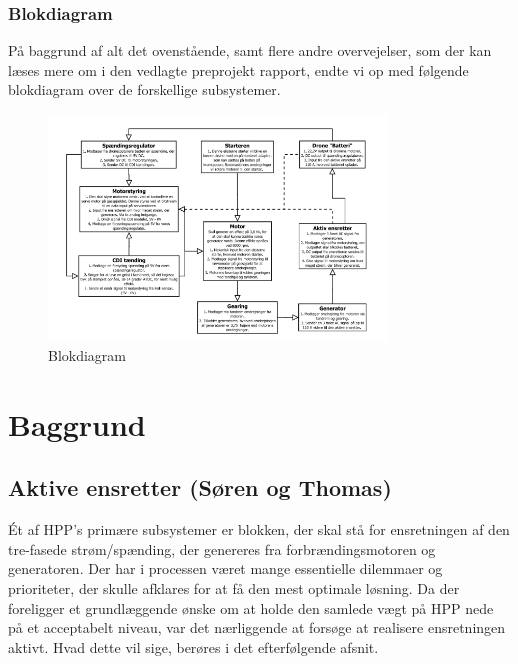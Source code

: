 \subsubsection{Blokdiagram}
\label{sec:blokdiagram-}

På baggrund af alt det ovenstående, samt flere andre overvejelser, som der kan læses mere om i den vedlagte preprojekt rapport, endte vi op med følgende blokdiagram over de forskellige subsystemer.

\begin{figure}[h]
  \centering
  \includegraphics[width=0.8\textwidth]{int2.png}
  \caption{Blokdiagram}
  \label{fig:int2}
\end{figure}


\clearpage
\section{Baggrund}
\label{sec:baggrund}

\subsection{Aktive ensretter (Søren og Thomas)}
\label{sec:aktive-ensretter}

Ét af HPP’s primære subsystemer er blokken, der skal stå for ensretningen af den tre-fasede strøm/spænding, der genereres fra forbrændingsmotoren og generatoren. Der har i processen været mange essentielle dilemmaer og prioriteter, der skulle afklares for at få den mest optimale løsning. Da der foreligger et grundlæggende ønske om at holde den samlede vægt på HPP nede på et acceptabelt niveau, var det nærliggende at forsøge at realisere ensretningen aktivt. Hvad dette vil sige, berøres i det efterfølgende afsnit.

